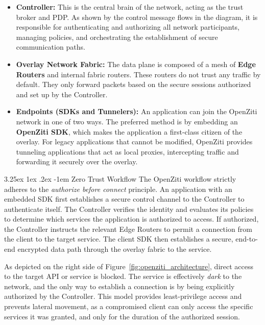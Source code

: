 \documentclass[12pt, a4paper, reqno, oneside]{book}
\makeatletter
\renewcommand\paragraph{\@startsection{paragraph}{5}{\z@}%
  {3.25ex \@plus1ex \@minus.2ex}%
  {-1em}%
  {\normalfont\normalsize\bfseries}}
\makeatother
\begin{document}
\begin{itemize}
    \item \textbf{Controller:} This is the central brain of the network, acting as the trust broker and PDP. As shown by the control message flows in the diagram, it is responsible for authenticating and authorizing all network participants, managing policies, and orchestrating the establishment of secure communication paths.
    
    \item \textbf{Overlay Network Fabric:} The data plane is composed of a mesh of \textbf{Edge Routers} and internal fabric routers. These routers do not trust any traffic by default. They only forward packets based on the secure sessions authorized and set up by the Controller.
    
    \item \textbf{Endpoints (SDKs and Tunnelers):} An application can join the OpenZiti network in one of two ways. The preferred method is by embedding an \textbf{OpenZiti SDK}, which makes the application a first-class citizen of the overlay. For legacy applications that cannot be modified, OpenZiti provides tunneling applications that act as local proxies, intercepting traffic and forwarding it securely over the overlay.
\end{itemize}

\paragraph{Zero Trust Workflow}
The OpenZiti workflow strictly adheres to the \textit{authorize before connect} principle. An application with an embedded SDK first establishes a secure control channel to the Controller to authenticate itself. The Controller verifies the identity and evaluates its policies to determine which services the application is authorized to access. If authorized, the Controller instructs the relevant Edge Routers to permit a connection from the client to the target service. The client SDK then establishes a secure, end-to-end encrypted data path through the overlay fabric to the service.

As depicted on the right side of Figure~\ref{fig:openziti_architecture}, direct access to the target API or service is blocked. The service is effectively \textit{dark} to the network, and the only way to establish a connection is by being explicitly authorized by the Controller. This model provides least-privilege access and prevents lateral movement, as a compromised client can only access the specific services it was granted, and only for the duration of the authorized session.
\end{document}
